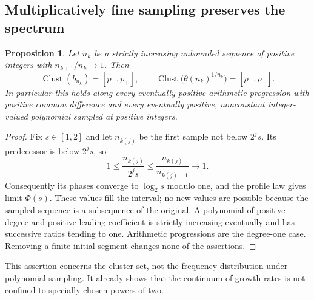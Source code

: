 \documentclass[11pt,a4paper]{article}
\numberwithin{equation}{section}
\newtheorem{proposition}[theorem]{Proposition}
\theoremstyle{definition}
\theoremstyle{remark}
\newcommand{\clust}{\operatorname{Clust}}
\theoremstyle{definition}
\theoremstyle{plain}
\begin{document}
\subsection{Multiplicatively fine sampling preserves the spectrum}
\begin{proposition}
\label{dsr:prop:fine-sampling}
Let $n_k$ be a strictly increasing unbounded sequence of positive integers
with $n_{k+1}/n_k\to1$. Then
\begin{equation}
 \clust(b_{n_k})=[p_-,p_+],\qquad
 \clust\bigl(\theta(n_k)^{1/n_k}\bigr)=[\rho_-,\rho_+].
\end{equation}
In particular this holds along every eventually positive arithmetic
progression with positive common difference and every eventually positive,
nonconstant integer-valued
polynomial sampled at positive integers.
\end{proposition}
\begin{proof}
Fix $s\in[1,2]$ and let $n_{k(j)}$ be the first sample not below $2^js$.
Its predecessor is below $2^js$, so
\[
 1\le\frac{n_{k(j)}}{2^js}
 \le\frac{n_{k(j)}}{n_{k(j)-1}}\longrightarrow1.
\]
Consequently its phases converge to $\log_2s$ modulo one, and the profile
law gives limit $\Phi(s)$. These values fill the interval; no new values are
possible because the sampled sequence is a subsequence of the original.
A polynomial of positive degree and positive leading coefficient is
strictly increasing eventually and has successive ratios tending to one.
Arithmetic progressions are the degree-one case. Removing a finite initial
segment changes none of the assertions.
\end{proof}
This assertion concerns the cluster set, not the frequency distribution
under polynomial sampling. It already shows that the continuum of growth
rates is not confined to specially chosen powers of two.
\end{document}
